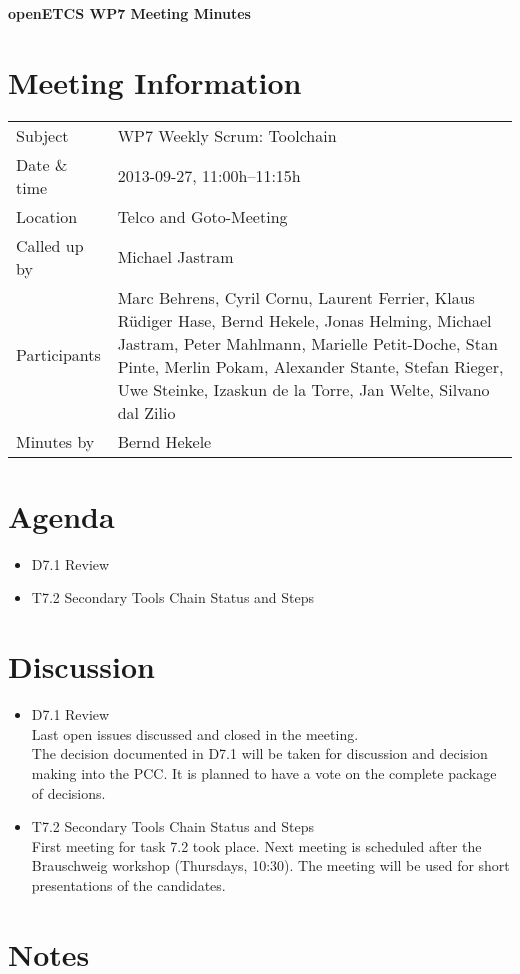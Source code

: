 \documentclass[a4paper, 11pt]{article}
\begin{document}
{\begin{center}\huge\bf openETCS WP7 Meeting Minutes\end{center}}
\section{Meeting Information}

\renewcommand{\arraystretch}{1.5}
\begin{supertabular}{m{.2\textwidth}m{.8\textwidth}}
Subject & WP7 Weekly Scrum: Toolchain\\
Date \& time & 2013-09-27, 11:00h--11:15h\\
Location & Telco and Goto-Meeting\\
Called up by & 
Michael Jastram\\
Participants &
Marc Behrens,
Cyril Cornu,
Laurent Ferrier,
Klaus R\"udiger Hase,
Bernd Hekele,
Jonas Helming,
Michael Jastram,
Peter Mahlmann,
Marielle Petit-Doche,
Stan Pinte,
Merlin Pokam,
Alexander Stante,
Stefan Rieger,
Uwe Steinke,
Izaskun de la Torre,
Jan Welte,
Silvano dal Zilio
\\

Minutes by & Bernd Hekele\\

\end{supertabular}
\renewcommand{\arraystretch}{1.0}


\section{Agenda}
\begin{itemize}
\item D7.1 Review
\item T7.2 Secondary Tools Chain Status and Steps
\end{itemize}

\section{Discussion}

\begin{itemize}
\item D7.1 Review\\
Last open issues discussed and closed in the meeting.\\
The decision documented in D7.1 will be taken for discussion and decision making into the PCC. It is planned to have a vote on the complete package of decisions.

\item T7.2 Secondary Tools Chain Status and Steps\\
First meeting for task 7.2 took place. Next meeting is scheduled after the Brauschweig workshop (Thursdays, 10:30). The meeting will be used for short presentations of the candidates.

\end{itemize}

\section{Notes}
\end{document}
